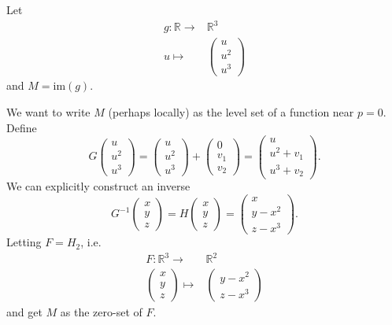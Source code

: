 \documentclass[12pt]{article}
\begin{document}
\begin{example}
	Let 
	\begin{align*}
		g:\mathbb{R} \to& \mathbb{R}^3 \\
		u \mapsto& \begin{pmatrix}u\\ u^2\\ u^3\end{pmatrix}
	\end{align*}
	and $M=\text{im}(g)$.

	We want to write $M$ (perhaps locally) as the level set of a function near $p=0$. Define 
	\begin{equation*}
		G\begin{pmatrix}u\\ u^2\\ u^3\end{pmatrix} = \begin{pmatrix}u\\ u^2\\ u^3\end{pmatrix} + \begin{pmatrix}0\\ v_1\\ v_2\end{pmatrix} = \begin{pmatrix}u\\ u^2+v_1\\ u^3+v_2\end{pmatrix}.
	\end{equation*}
	We can explicitly construct an inverse 
	\begin{equation*}
		G^{-1}\begin{pmatrix}x\\ y\\ z\end{pmatrix} = H\begin{pmatrix}x\\ y\\ z\end{pmatrix} = \begin{pmatrix}x\\ y-x^2\\ z-x^3\end{pmatrix}.
	\end{equation*}
	Letting $F=H_2$, i.e. 
	\begin{align*}
		F:\mathbb{R}^3 \to& \mathbb{R}^2 \\
		\begin{pmatrix}x\\ y\\ z\end{pmatrix} \mapsto& \begin{pmatrix}y-x^2\\ z-x^3\end{pmatrix}
	\end{align*}
	and get $M$ as the zero-set of $F$.
\end{example}
\end{document}
